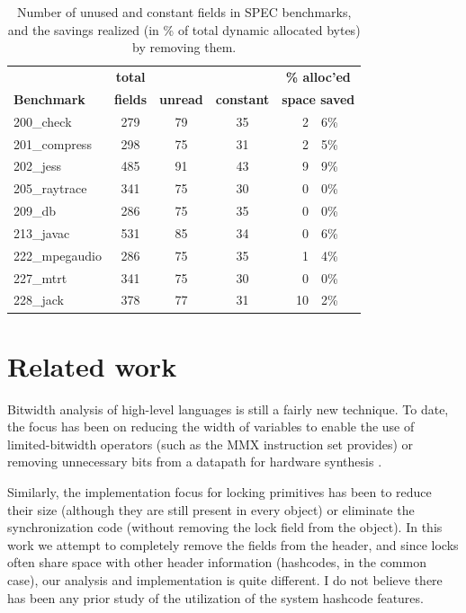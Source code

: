 \documentclass[preprint]{acmconf}
\begin{document}
\begin{table}
\begin{tabular}{lcccr@{.}l}
&\bf total&&&\multicolumn{2}{c}{\bf\% alloc'ed}\\
\bf Benchmark &\bf fields &\bf unread &\bf constant &
\multicolumn{2}{c}{\bf space saved} \\\hline
200\_check      & 279 &   79   &   35   &  2&6\% \\
201\_compress   & 298 &   75   &   31   &  2&5\% \\
202\_jess       & 485 &   91   &   43   &  9&9\% \\
205\_raytrace   & 341 &   75   &   30   &  0&0\% \\
209\_db         & 286 &   75   &   35   &  0&0\% \\
213\_javac      & 531 &   85   &   34   &  0&6\% \\
222\_mpegaudio  & 286 &   75   &   35   &  1&4\% \\
227\_mtrt       & 341 &   75   &   30   &  0&0\% \\
228\_jack       & 378 &   77   &   31   & 10&2\% \\
\end{tabular}
\caption{Number of unused and constant fields in SPEC benchmarks,
  and the savings realized (in \% of total dynamic allocated bytes) by
  removing them.}
\label{tab:const-unused}
\end{table}


\section{Related work}


Bitwidth analysis of high-level languages is still a fairly new
technique.  To date, the focus has been on
reducing the width of variables to enable the use of limited-bitwidth
operators (such as the MMX instruction set provides)
or removing unnecessary bits from a datapath for
hardware synthesis \cite{stephenson00,ananian:siliconc}.

Similarly, the implementation focus for locking primitives has been to
reduce their size \cite{bacon98} (although they are still present in
every object) or eliminate the synchronization code
\cite{salcianu01} (without removing the lock field from the object).
In this work we attempt to completely remove the fields from the
header, and since locks often share space with other
header information (hashcodes, in the common case), our analysis and
implementation is quite different.  I do not believe there has been
any prior study of the utilization of the system hashcode features.
\end{document}
